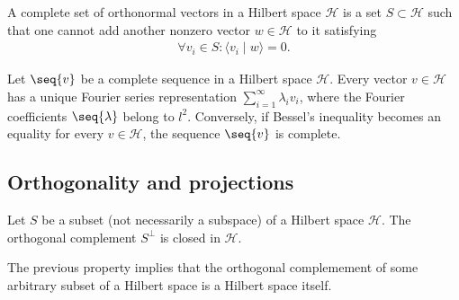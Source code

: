     \begin{adefinition}
        A complete set of orthonormal vectors in a Hilbert space $\mathcal{H}$ is a set $S\subset\mathcal{H}$ such that one cannot add another nonzero vector $w\in\mathcal{H}$ to it satisfying
        \begin{gather}
            \forall v_i\in S:\langle v_i\mid w \rangle = 0.
        \end{gather}
    \end{adefinition}

    \begin{theorem}[Parceval]
        Let $\seq{v}$ be a complete sequence in a Hilbert space $\mathcal{H}$. Every vector $v\in\mathcal{H}$ has a unique Fourier series representation $\sum_{i=1}^\infty\lambda_iv_i$, where the Fourier coefficients $\seq{\lambda}$ belong to $l^2$. Conversely, if Bessel's inequality becomes an equality for every $v\in\mathcal{H}$, the sequence $\seq{v}$ is complete.
    \end{theorem}

\subsection{Orthogonality and projections}

    \begin{property}
        Let $S$ be a subset (not necessarily a subspace) of a Hilbert space $\mathcal{H}$. The orthogonal complement $S^\perp$ is closed in $\mathcal{H}$.
    \end{property}
    \begin{result}
        The previous property implies that the orthogonal complemement of some arbitrary subset of a Hilbert space is a Hilbert space itself.
    \end{result}

